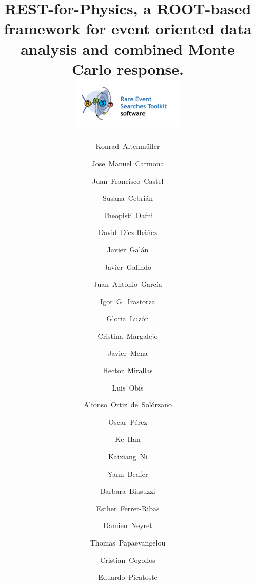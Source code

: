 \documentclass[article]{elsarticle}
\begin{document}
\begin{frontmatter}

\title{REST-for-Physics, a ROOT-based framework for event oriented data analysis and combined Monte Carlo response.\\ \includegraphics[height=25mm]{RESTlogoFull.png}}


\author{Konrad~Altenm\"uller}
\author{Jose~Manuel~Carmona}
\author{Juan~Francisco~Castel}
\author{Susana~Cebri\'an}
\author{Theopisti~Dafni}
\author{David~D\'iez-Ib\'añez}
\author{Javier~Gal\'an}
\author{Javier~Galindo}
\author{Juan~Antonio~Garc\'ia}
\author{Igor~G.~Irastorza}
\author{Gloria~Luz\'on}
\author{Cristina~Margalejo}
\author{Javier~Mena}
\author{Hector~Mirallas}
\author{Luis~Obis}
\author{Alfonso~Ortiz~de~Sol\'orzano}
\author{Oscar~P\'erez}

\address{Center for Astroparticles and High Energy Physics (CAPA), Universidad de Zaragoza, 50009 Zaragoza, Spain}

\author{Ke~Han}
\author{Kaixiang~Ni}
\address{INPAC; Shanghai Laboratory for Particle Physics and Cosmology; Key Laboratory for Particle Astrophysics and Cosmology (MOE), School of Physics and Astronomy, Shanghai Jiao Tong University, Shanghai 200240, China}


\author{Yann~Bedfer}
\author{Barbara~Biasuzzi}
\author{Esther~Ferrer-Ribas}
\author{Damien~Neyret}
\author{Thomas~Papaevangelou}
\address{IRFU, CEA, Universit\'e Paris-Saclay, F-91191 Gif-sur-Yvette, France}

\author{Cristian~Cogollos}
\author{Eduardo~Picatoste}
\address{Institut de Ci\`encies del Cosmos, Universitat de Barcelona, Barcelona, Spain}
\address{Departament de F\'isica Qu\`antica i Astrof\'isica, Universitat de Barcelona, Barcelona, Spain}


\end{frontmatter}
\end{document}
